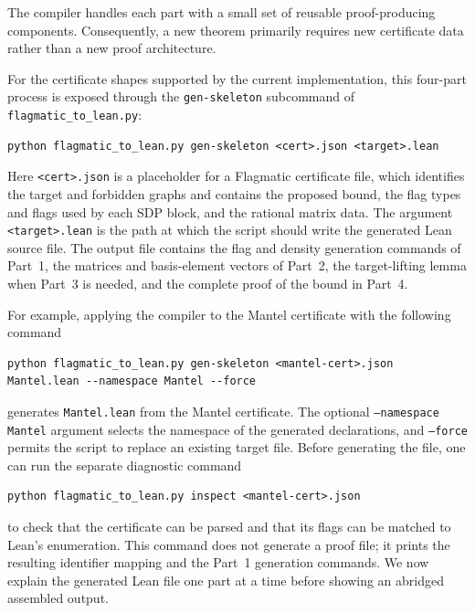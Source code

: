 \documentclass{article}
\newcommand{\lean}[1]{\texttt{#1}}
\begin{document}
The compiler handles each part with a small set of reusable proof-producing
components.  Consequently, a new theorem primarily requires new certificate
data rather than a new proof architecture.

For the certificate shapes supported by the current implementation, this
four-part process is exposed through the \lean{gen-skeleton} subcommand of
\lean{flagmatic\_to\_lean.py}:
\begin{lstlisting}[language={}]
python flagmatic_to_lean.py gen-skeleton <cert>.json <target>.lean
\end{lstlisting}
Here \lean{<cert>.json} is a placeholder for a Flagmatic certificate file, which
identifies the target and forbidden graphs and contains the proposed bound,
the flag types and flags used by each SDP block, and the rational matrix data.  The
argument \lean{<target>.lean} is the path at which the script should write the
generated Lean source file.  The output file contains the flag and
density generation commands of Part~1, the matrices and basis-element vectors
of Part~2, the target-lifting lemma when Part~3 is needed, and the complete
proof of the bound in Part~4.

For example, applying the compiler to the Mantel certificate with
the following command
\begin{lstlisting}[language={}]
python flagmatic_to_lean.py gen-skeleton <mantel-cert>.json Mantel.lean --namespace Mantel --force
\end{lstlisting}
generates \lean{Mantel.lean} from the Mantel certificate.  The optional
\lean{--namespace Mantel} argument selects the namespace of the generated
declarations, and \lean{--force} permits the script to replace an existing
target file.  Before generating the file, one can run the separate diagnostic
command
\begin{lstlisting}[language={}]
python flagmatic_to_lean.py inspect <mantel-cert>.json
\end{lstlisting}
to check that the certificate can be parsed and that its flags can be matched
to Lean's enumeration.  This command does not generate a proof file; it prints
the resulting identifier mapping and the Part~1 generation commands.  We now
explain the generated Lean file one part at a time before showing an abridged
assembled output.
\end{document}
